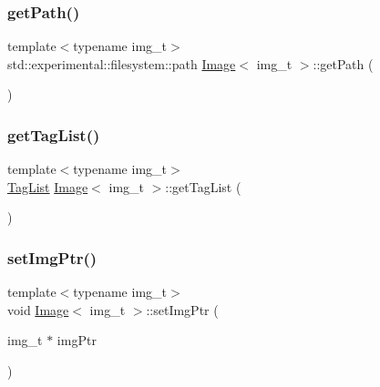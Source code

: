 \subsubsection{\texorpdfstring{get\+Path()}{getPath()}}
{\footnotesize\ttfamily template$<$typename img\+\_\+t$>$ \\
std\+::experimental\+::filesystem\+::path \hyperlink{class_image}{Image}$<$ img\+\_\+t $>$\+::get\+Path (\begin{DoxyParamCaption}{ }\end{DoxyParamCaption})\hspace{0.3cm}{\ttfamily [inline]}}

\mbox{\label{class_image_a35c662168b7b44e9372993691d422ad2}} 
\subsubsection{\texorpdfstring{get\+Tag\+List()}{getTagList()}}
{\footnotesize\ttfamily template$<$typename img\+\_\+t$>$ \\
\hyperlink{_tag_list_8hpp_ac0222328791bb6c859b87ac65d5e9f65}{Tag\+List} \hyperlink{class_image}{Image}$<$ img\+\_\+t $>$\+::get\+Tag\+List (\begin{DoxyParamCaption}{ }\end{DoxyParamCaption})\hspace{0.3cm}{\ttfamily [inline]}}

\mbox{\label{class_image_aa21c33b7da565d5b4576c5e56ba08cac}} 
\subsubsection{\texorpdfstring{set\+Img\+Ptr()}{setImgPtr()}}
{\footnotesize\ttfamily template$<$typename img\+\_\+t$>$ \\
void \hyperlink{class_image}{Image}$<$ img\+\_\+t $>$\+::set\+Img\+Ptr (\begin{DoxyParamCaption}\item[{img\+\_\+t $\ast$}]{img\+Ptr }\end{DoxyParamCaption})\hspace{0.3cm}{\ttfamily [inline]}}

\mbox{\label{class_image_ad7a712265f2243a3292e763b964110b8}} 
